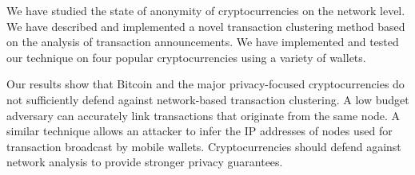 We have studied the state of anonymity of cryptocurrencies on the network level.
We have described and implemented a novel transaction clustering method based on the analysis of transaction announcements.
We have implemented and tested our technique on four popular cryptocurrencies using a variety of wallets.

Our results show that Bitcoin and the major privacy-focused cryptocurrencies do not sufficiently defend against network-based transaction clustering.
A low budget adversary can accurately link transactions that originate from the same node.
A similar technique allows an attacker to infer the IP addresses of nodes used for transaction broadcast by mobile wallets.
Cryptocurrencies should defend against network analysis to provide stronger privacy guarantees.
